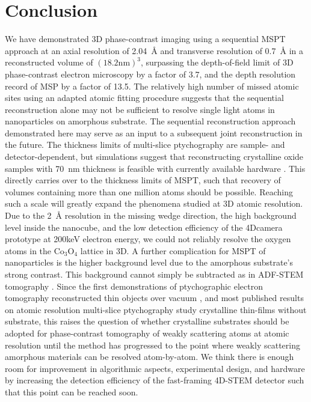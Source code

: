 \documentclass[12pt]{iopart}
\begin{document}
\section{Conclusion}
We have demonstrated 3D phase-contrast imaging using a sequential MSPT approach at an axial resolution of \SI{2.04}{\angstrom} and transverse resolution of \SI{0.7}{\angstrom} in a reconstructed volume of $\mathrm{(18.2 nm)^3}$, surpassing the depth-of-field limit of 3D phase-contrast electron microscopy by a factor of \num{3.7}, and the depth resolution record of MSP by a factor of \num{13.5}. The relatively high number of missed atomic sites using an adapted atomic fitting procedure suggests that the sequential reconstruction alone may not be sufficient to resolve single light atoms in nanoparticles on amorphous substrate. The sequential reconstruction approach demonstrated here may serve as an input to a subsequent joint reconstruction in the future. The thickness limits of multi-slice ptychography are sample- and detector-dependent, but simulations suggest that reconstructing crystalline oxide samples with \SI{70}{\nano\meter} thickness is feasible with currently available hardware \cite{chen2021electron}. This directly carries over to the thickness limits of MSPT, such that recovery of volumes containing more than one million atoms should be possible. Reaching such a scale will greatly expand the phenomena studied at 3D atomic resolution.\\
Due to the \SI{2}{\angstrom} resolution in the missing wedge direction, the high background level inside the nanocube, and the low detection efficiency of the 4Dcamera prototype at 200keV electron energy, we could not reliably resolve the oxygen atoms in the $\mathrm{Co_{3}O_{4}}$ lattice in 3D. A further complication for MSPT of nanoparticles is the higher background level due to the amorphous substrate's strong contrast. This background cannot simply be subtracted as in ADF-STEM tomography \cite{Yang_2021}. Since the first demonstrations of ptychographic electron tomography reconstructed thin objects over vacuum \cite{Pelz_2023, Hofer_2023}, and most published results on atomic resolution multi-slice ptychography study crystalline thin-films without substrate, this raises the question of whether crystalline substrates should be adopted for phase-contrast tomography of weakly scattering atoms at atomic resolution until the method has progressed to the point where weakly scattering amorphous materials can be resolved atom-by-atom. We think there is enough room for improvement in algorithmic aspects, experimental design, and hardware by increasing the detection efficiency of the fast-framing 4D-STEM detector such that this point can be reached soon. \\
\end{document}
